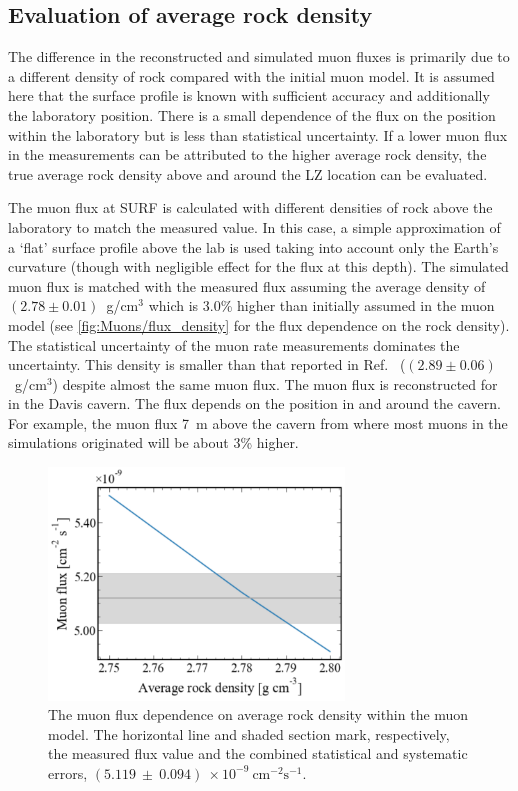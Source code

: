 \subsection{Evaluation of average rock density}\label{sec:Muons/RockDensity}
The difference in the reconstructed and simulated muon fluxes is primarily due to a different density of rock compared with the initial muon model. It is assumed here that the surface profile is known with sufficient accuracy and additionally the laboratory position. There is a small dependence of the flux on the position within the laboratory but is less than statistical uncertainty. 
If a lower muon flux in the measurements can be attributed to the higher average rock density, the true average rock density above and around the LZ location can be evaluated. 

The muon flux at SURF is calculated with different densities of rock above the laboratory to match the measured value. In this case, a simple approximation of a `flat' surface profile above the lab is used taking into account only the Earth's curvature (though with negligible effect for the flux at this depth). The simulated muon flux is matched with the measured flux assuming the average density of $(2.78 \pm 0.01)$~g/cm$^3$ which is 3.0\% higher than initially assumed in the muon model (see \autoref{fig:Muons/flux_density} for the flux dependence on the rock density). The statistical uncertainty of the muon rate measurements dominates the uncertainty. This density is smaller than that reported in Ref.~\cite{majorana} ($(2.89 \pm 0.06)$~g/cm$^3$) despite almost the same muon flux. 
The muon flux is reconstructed for in the Davis cavern. The flux depends on the position in and around the cavern. For example, the muon flux 7~m above the cavern from where most muons in the simulations originated will be about 3\% higher. 

\begin{figure}[t!]
    \centering
    \includegraphics[width=0.7\textwidth]{figures/Muons/Flux_density_ws22_ws24.pdf}
    \caption[The muon flux dependence on average rock density within the muon model.]{The muon flux dependence on average rock density within the muon model. The horizontal line and shaded section mark, respectively, the measured flux value and the combined statistical and systematic errors, $(5.119~\pm~0.094)~\times10^{-9}~\textrm{cm}^{-2}\textrm{s}^{-1}$.}
    \label{fig:Muons/flux_density}
\end{figure}

